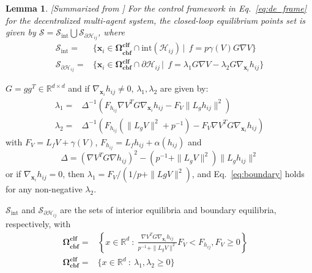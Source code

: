 \documentclass[letterpaper, 10 pt, conference]{ieeeconf}
\theoremstyle{plain}
\newtheorem{lemma}[theorem]{Lemma}
\begin{document}
\begin{lemma} \label{lem:deadlock}
[Summarized from \cite{reis2020control}] 
For the control framework in Eq.~\eqref{eq:de_frame} for the decentralized multi-agent system, the closed-loop equilibrium points set is given by $
\mathcal{S} = \mathcal{S}_{\mathrm{int}} \bigcup \mathcal{S}_{\partial \mathcal{H}_{ij}}$, where
{
\footnotesize
\begin{align} 
\mathcal {S}_{\mathrm {int}}=&\{ \mathbf{x}_i \in {\boldsymbol{\Omega }_{\overline {\mathbf {cbf}}}^{\mathbf {clf}}} \cap \mathrm {int}(\mathcal {H}_{ij}) \,|\;\, 
f
= p \gamma (V) G \nabla V \} \\ 
\mathcal {S}_{\partial \mathcal {H}_{ij}}=&\{ \mathbf{x}_i \in {\mathbf {\Omega _{cbf}^{clf}}} \cap \partial \mathcal {H}_{ij} \,|\;\, 
f
= \lambda _{1} G \nabla V - \lambda _{2} G \nabla_{\mathbf{x}_i} h_{ij} \} \label{eq:boundary}
\end{align}}
\end{lemma}
$G=gg^{T}\in\mathbb{R}^{d\times d}$
and 
if $\nabla_{\mathbf{x}_i} h_{ij} \neq 0$, $\lambda _1,\lambda _2$ are given by: 
{\footnotesize
\begin{align*} \lambda _{1}=&\Delta ^{-1} \left ({F_{h_{ij}} \nabla V^{{T}} G \nabla_{\mathbf{x}_i} h_{ij} - F_{V} \| {L_{g} h_{ij}} \|^{2} }\right) \\ \lambda _{2}=&\Delta ^{-1} \left ({F_{h_{ij}} \left ({\| {L_{g} V} \|^{2} + p^{-1} }\right) - F_{V} \nabla V^{{T}} G \nabla_{\mathbf{x}_i} h_{ij} }\right) \end{align*}}
with $F_V = L_fV + \gamma(V)$, $F_{h_{ij}} = L_fh_{ij}+\alpha(h_{ij})$ and
{\footnotesize
\begin{equation*} \Delta = (\nabla V^{{T}} G \nabla h_{ij})^{2} - (p^{-1} + \| {L_{g} V} \|^{2}) \| {L_{g} h_{ij}} \|^{2}
\end{equation*}}
or if $\nabla_{\mathbf{x}_i} h_{ij} = 0$, then $\lambda_1 = F_V/(1/p+ \|LgV\|^{2})$, 
and Eq.~\eqref{eq:boundary} holds for any non-negative $\lambda_2$.


$\mathcal{S}_{\mathrm{int}}$ and $\mathcal{S}_{\partial \mathcal{H}_{ij}}$ are the sets of interior equilibria and boundary equilibria, respectively, with
{ \footnotesize
\begin{align*} {\boldsymbol{\Omega }_{\overline {\mathbf {cbf}}}^{\mathbf {clf}}}=&\left\{{ x \in \mathbb {R}^{d}~:~\frac {\nabla V^{{T}} G \nabla_{\mathbf{x}_i} h_{ij}}{p^{-1} + \| {L_{g} V} \|^{2}} F_{V} < F_{h_{ij}} , F_{V} \ge 0 }\right\} \quad \\ {\mathbf {\Omega _{cbf}^{clf}}}=&\{ x \in \mathbb {R}^{d}~:~\lambda _{1}, \lambda _{2} \ge 0 \} \end{align*}}
\end{document}
